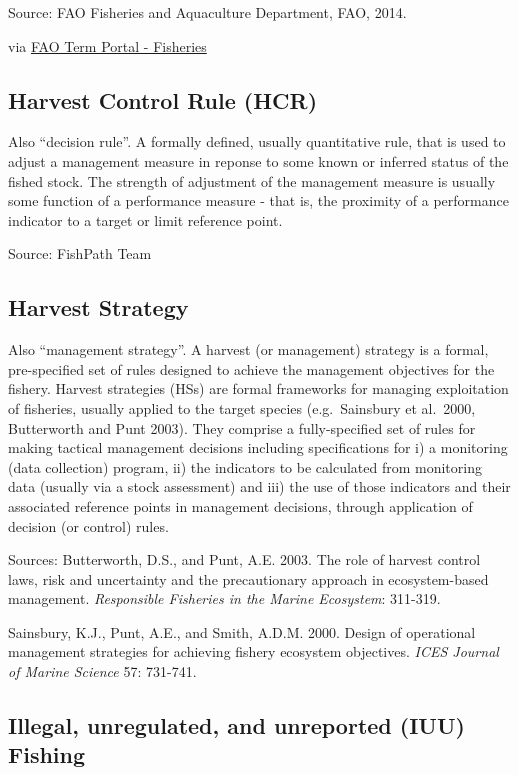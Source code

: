 \documentclass[
  11pt,
]{book}
\begin{document}
Source: FAO Fisheries and Aquaculture Department, FAO, 2014.

via \href{http://www.fao.org/fishery/glossary/en}{FAO Term Portal - Fisheries}

\hypertarget{harvest-control-rule-hcr}{%
\subsection{Harvest Control Rule (HCR)}\label{harvest-control-rule-hcr}}

Also ``decision rule''. A formally defined, usually quantitative rule, that is used to adjust a management measure in reponse to some known or inferred status of the fished stock. The strength of adjustment of the management measure is usually some function of a performance measure - that is, the proximity of a performance indicator to a target or limit reference point.

Source: FishPath Team

\hypertarget{harvest-strategy}{%
\subsection{Harvest Strategy}\label{harvest-strategy}}

Also ``management strategy''. A harvest (or management) strategy is a formal, pre-specified set of rules designed to achieve the management objectives for the fishery. Harvest strategies (HSs) are formal frameworks for managing exploitation of fisheries, usually applied to the target species (e.g.~Sainsbury et al.~2000, Butterworth and Punt 2003). They comprise a fully-specified set of rules for making tactical management decisions including specifications for i) a monitoring (data collection) program, ii) the indicators to be calculated from monitoring data (usually via a stock assessment) and iii) the use of those indicators and their associated reference points in management decisions, through application of decision (or control) rules.

Sources: Butterworth, D.S., and Punt, A.E. 2003. The role of harvest control laws, risk and uncertainty and the precautionary approach in ecosystem-based management. \emph{Responsible Fisheries in the Marine Ecosystem}: 311-319.

Sainsbury, K.J., Punt, A.E., and Smith, A.D.M. 2000. Design of operational management strategies
for achieving fishery ecosystem objectives. \emph{ICES Journal of Marine Science} 57: 731-741.

\hypertarget{illegal-unregulated-and-unreported-iuu-fishing}{%
\subsection{Illegal, unregulated, and unreported (IUU) Fishing}\label{illegal-unregulated-and-unreported-iuu-fishing}}
\end{document}

